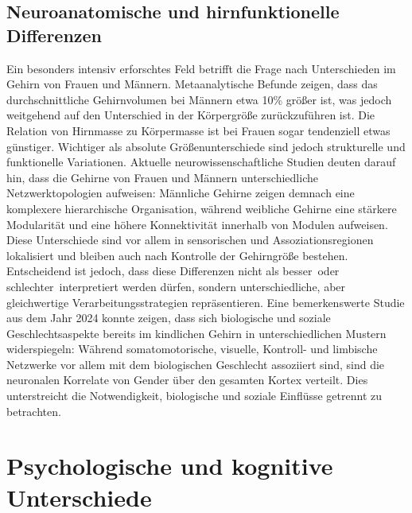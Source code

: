 \documentclass[12pt,a4paper]{article}
\begin{document}
	\subsection{Neuroanatomische und hirnfunktionelle Differenzen}
	Ein besonders intensiv erforschtes Feld betrifft die Frage nach Unterschieden im Gehirn von Frauen und Männern. Metaanalytische Befunde zeigen, dass das durchschnittliche Gehirnvolumen bei Männern etwa 10\% größer ist, was jedoch weitgehend auf den Unterschied in der Körpergröße zurückzuführen ist. Die Relation von Hirnmasse zu Körpermasse ist bei Frauen sogar tendenziell etwas günstiger. \cite{Spektrum} Wichtiger als absolute Größenunterschiede sind jedoch strukturelle und funktionelle Variationen.
	Aktuelle neurowissenschaftliche Studien deuten darauf hin, dass die Gehirne von Frauen und Männern unterschiedliche Netzwerktopologien aufweisen: Männliche Gehirne zeigen demnach eine komplexere hierarchische Organisation, während weibliche Gehirne eine stärkere Modularität und eine höhere Konnektivität innerhalb von Modulen aufweisen. \cite{PMC11507829} Diese Unterschiede sind vor allem in sensorischen und Assoziationsregionen lokalisiert und bleiben auch nach Kontrolle der Gehirngröße bestehen. \cite{NatureCommunications2024} Entscheidend ist jedoch, dass diese Differenzen nicht als \glqq besser\grqq\ oder \glqq schlechter\grqq\ interpretiert werden dürfen, sondern unterschiedliche, aber gleichwertige Verarbeitungsstrategien repräsentieren.
	Eine bemerkenswerte Studie aus dem Jahr 2024 konnte zeigen, dass sich biologische und soziale Geschlechtsaspekte bereits im kindlichen Gehirn in unterschiedlichen Mustern widerspiegeln: Während somatomotorische, visuelle, Kontroll- und limbische Netzwerke vor allem mit dem biologischen Geschlecht assoziiert sind, sind die neuronalen Korrelate von Gender über den gesamten Kortex verteilt. \cite{Science2024} Dies unterstreicht die Notwendigkeit, biologische und soziale Einflüsse getrennt zu betrachten.
	
	\section{Psychologische und kognitive Unterschiede}
\end{document}
